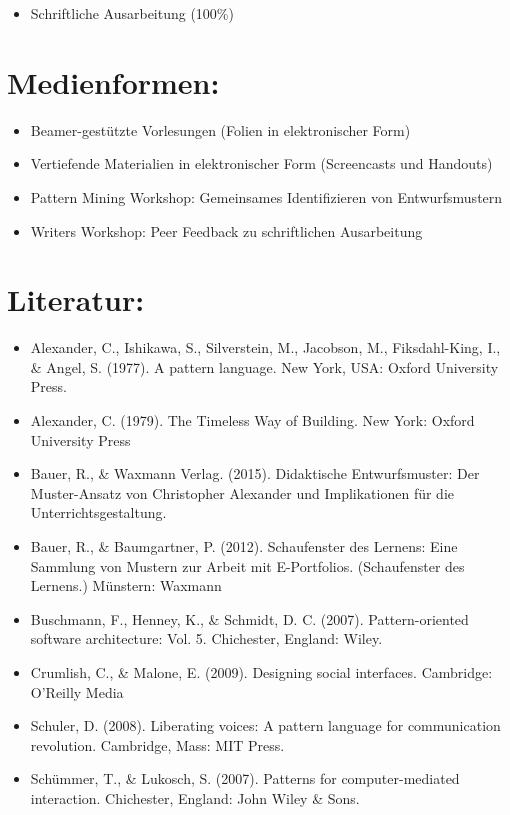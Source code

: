\begin{itemize}
\tightlist
\item
  Schriftliche Ausarbeitung (100\%)
\end{itemize}

\section*{Medienformen:}\label{medienformen-12}

\begin{itemize}
\tightlist
\item
  Beamer-gestützte Vorlesungen (Folien in elektronischer Form)
\item
  Vertiefende Materialien in elektronischer Form (Screencasts und
  Handouts)
\item
  Pattern Mining Workshop: Gemeinsames Identifizieren von
  Entwurfsmustern
\item
  Writers Workshop: Peer Feedback zu schriftlichen Ausarbeitung
\end{itemize}

\section*{Literatur:}\label{literatur-12}

\begin{itemize}
\tightlist
\item
  Alexander, C., Ishikawa, S., Silverstein, M., Jacobson, M.,
  Fiksdahl-King, I., \& Angel, S. (1977). A pattern language. New York,
  USA: Oxford University Press.
\item
  Alexander, C. (1979). The Timeless Way of Building. New York: Oxford
  University Press
\item
  Bauer, R., \& Waxmann Verlag. (2015). Didaktische Entwurfsmuster: Der
  Muster-Ansatz von Christopher Alexander und Implikationen für die
  Unterrichtsgestaltung.
\item
  Bauer, R., \& Baumgartner, P. (2012). Schaufenster des Lernens: Eine
  Sammlung von Mustern zur Arbeit mit E-Portfolios. (Schaufenster des
  Lernens.) Münstern: Waxmann
\item
  Buschmann, F., Henney, K., \& Schmidt, D. C. (2007). Pattern-oriented
  software architecture: Vol. 5. Chichester, England: Wiley.
\item
  Crumlish, C., \& Malone, E. (2009). Designing social interfaces.
  Cambridge: O'Reilly Media
\item
  Schuler, D. (2008). Liberating voices: A pattern language for
  communication revolution. Cambridge, Mass: MIT Press.
\item
  Schümmer, T., \& Lukosch, S. (2007). Patterns for computer-mediated
  interaction. Chichester, England: John Wiley \& Sons.
\end{itemize}

